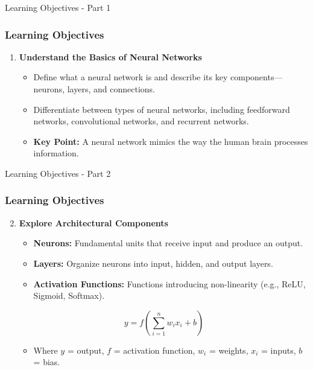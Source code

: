 \documentclass[aspectratio=169]{beamer}
\begin{document}
\begin{frame}[fragile]{Learning Objectives - Part 1}
    \frametitle{Learning Objectives}
    \begin{enumerate}
        \item \textbf{Understand the Basics of Neural Networks}
            \begin{itemize}
                \item Define what a neural network is and describe its key components—neurons, layers, and connections.
                \item Differentiate between types of neural networks, including feedforward networks, convolutional networks, and recurrent networks.
                \item \textbf{Key Point:} A neural network mimics the way the human brain processes information.
            \end{itemize}
    \end{enumerate}
\end{frame}

\begin{frame}[fragile]{Learning Objectives - Part 2}
    \frametitle{Learning Objectives}
    \begin{enumerate}
        \setcounter{enumi}{1}
        \item \textbf{Explore Architectural Components}
            \begin{itemize}
                \item \textbf{Neurons:} Fundamental units that receive input and produce an output.
                \item \textbf{Layers:} Organize neurons into input, hidden, and output layers.
                \item \textbf{Activation Functions:} Functions introducing non-linearity (e.g., ReLU, Sigmoid, Softmax).
            \end{itemize}
            \begin{equation}
                y = f\left(\sum_{i=1}^{n} w_i x_i + b\right)
            \end{equation}
            \begin{itemize}
                \item Where \( y \) = output, \( f \) = activation function, \( w_i \) = weights, \( x_i \) = inputs, \( b \) = bias.
            \end{itemize}
    \end{enumerate}
\end{frame}
\end{document}
